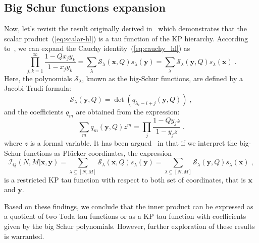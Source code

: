 \documentclass[a4paper,11pt]{amsart}
\begin{document}

\subsection{Big Schur functions expansion}
Now, let's revisit the result originally derived in~\cite{Foda:2008hn}
which demonstrates that the scalar product~(\ref{eq:scalar-hl}) is a
tau function of the KP hierarchy. According to~\cite[Chapter 3,
  Section 4, Equation (4.7)]{Macdonald:1998}, we can expand the Cauchy
identity~(\ref{eq:cauchy_hl}) as
\begin{equation}
 \prod_{j, k=1}^\infty \frac{1-Q x_j y_k}{1 - x_j y_k} = 
\sum_{\lambda} \mathcal{S}_{\lambda}(\bm{x}, Q) s_{\lambda}(\bm{y}) =
\sum_{\lambda} \mathcal{S}_{\lambda}(\bm{y}, Q) s_{\lambda}(\bm{x}) \; .
\end{equation}
Here, the polynomials \(\mathcal{S}_\lambda\), known as the big-Schur
functions, are defined by a Jacobi-Trudi formula:
\begin{equation}
  \mathcal{S}_{\lambda} (\bm{y}, Q) = \det(q_{\lambda_i -i + j}(\bm{y}, Q))\; , 
\end{equation}
and the coefficients \(q_m\) are obtained from the expression:
\begin{equation}
 \sum_{m} q_m(\bm{y}, Q) z^m =
 \prod_{j} \frac{1-Q y_j z}{1 - y_j z}\; .
\end{equation}
where \(z\) is a formal variable. It has been
argued~\cite{Foda:2008hn} in that if we interpret the big-Schur
functions as Plücker coordinates, the expression
\begin{equation}
\label{eq:big-expansion}
  \mathcal{I}_Q(N,M | \bm{x}, \bm{y})
  = \sum_{\lambda \subseteq [N,M]} \mathcal{S}_{\lambda}(\bm{x}, Q) s_{\lambda}(\bm{y})
  = \sum_{\lambda \subseteq [N,M]} \mathcal{S}_{\lambda}(\bm{y}, Q) s_{\lambda}(\bm{x})\; ,
\end{equation}
is a restricted KP tau function with respect to both set of coordinates,
that is \(\bm{x}\) and \(\bm{y}\).

Based on these findings, we conclude that the inner product can be
expressed as a quotient of two Toda tau functions or as a KP tau
function with coefficients given by the big Schur
polynomials. However, further exploration of these results is
warranted.

\end{document}
